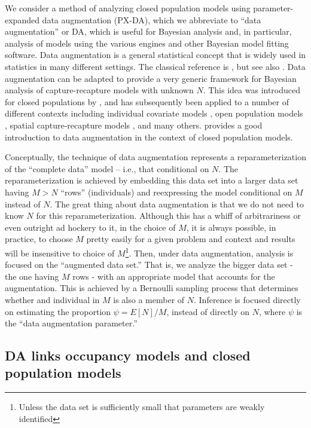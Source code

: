 We consider a method of analyzing closed population models using
parameter-expanded data augmentation (PX-DA), which we abbreviate to
``data augmentation'' or DA, which is useful for Bayesian analysis
and, in particular, analysis of models using the various \bugs engines
and other Bayesian model fitting software.  Data augmentation is a
general statistical concept that is widely used in statistics in many
different settings. The classical reference is
\citet{tanner_wong:1987}, but see also \citet{liu_wu:1999}.  Data
augmentation can be adapted to provide a very generic framework for
Bayesian analysis of capture-recapture models with unknown $N$. This
idea was introduced for closed populations by \citet{royle_etal:2007},
and has subsequently been applied to a number of different contexts
including individual covariate models \citep{royle:2009}, open
population models \citep{royle_dorazio:2008,royle_dorazio:2010,
  gardner_etal:2010ecol}, spatial capture-recapture models
\citep{royle_young:2008, royle_etal:2010, gardner_etal:2009}, and many
others. \citet[][Chapt. 6]{kery_schaub:2011} provides a good
introduction to data augmentation in the context of closed population
models.



Conceptually, the technique of data augmentation represents  a reparameterization of the
``complete data'' model -- i.e., that conditional on $N$. The
reparameterization is achieved by embedding this data set into a
larger data set having $M> N$ ``rows'' (individuals) and reexpressing
the model conditional on $M$ instead of $N$. The great thing about 
data augmentation is that we do not need to know $N$ for this reparameterization.
Although this has a whiff of
arbitrariness or even outright ad hockery to it, in the choice of $M$, 
it is always possible, in practice, to choose $M$ pretty easily for
a given problem and context and results will be insensitive to choice
of $M$\footnote{Unless the data set is sufficiently small that parameters are
weakly
identified}.
Then, under data augmentation, analysis
 is focused on the ``augmented data set.'' That is, we analyze the bigger
 data set - the one having $M$ rows - with an appropriate model that
 accounts for the augmentation. This is achieved by a Bernoulli sampling process that determines whether and individual in $M$ is also a member of $N$. 
Inference is focused directly on
 estimating the proportion $\psi = E[N]/M$, instead of directly on $N$,
 where $\psi$ is the ``data augmentation parameter.''


\subsection{DA links occupancy models and closed population models}


